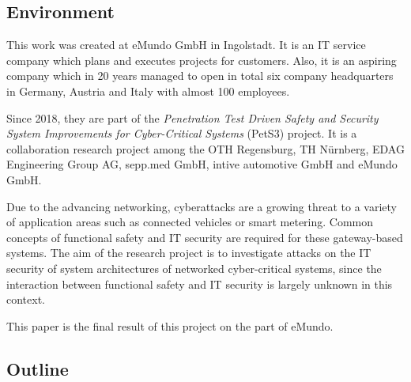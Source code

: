 \subsection{Environment}
This work was created at eMundo GmbH in Ingolstadt. It is an IT service company which plans and executes projects for customers. Also, it is an aspiring company which in 20 years managed to open in total six company headquarters in Germany, Austria and Italy with almost 100 employees.

Since 2018, they are part of the \emph{Penetration Test Driven Safety and Security System Improvements for Cyber-Critical Systems} (PetS3) project. It is a collaboration research project among the OTH Regensburg, TH Nürnberg, EDAG Engineering Group AG, sepp.med GmbH, intive automotive GmbH and eMundo GmbH.

Due to the advancing networking, cyberattacks are a growing threat to a variety of application areas such as connected vehicles or smart metering. Common concepts of functional safety and IT security are required for these gateway-based systems. The aim of the research project is to investigate attacks on the IT security of system architectures of networked cyber-critical systems, since the interaction between functional safety and IT security is largely unknown in this context.

This paper is the final result of this project on the part of eMundo.

\subsection{Outline}

